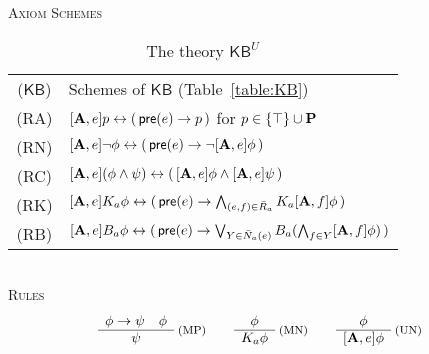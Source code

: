 \documentclass[12pt]{article}
\theoremstyle{definition}
\newcommand{\Prop}{{\bf P}}    %
\newcommand{\pre}{\mathsf{pre}}
\newcommand{\A}{{\bf A}}
\newcommand{\KB}{{\mathsf{KB}}}                        %
\begin{document}
\begin{table}[ht]
  \begin{center}
    \textsc{Axiom Schemes}\\[.4em]
    \renewcommand{\arraystretch}{1.3}
    \begin{tabular}[t]{cl}
      ($\KB$) & 
      Schemes of $\KB$ (Table~\ref{table:KB})
      \\
      (RA) &
      $[\A,e]p \leftrightarrow(\,\pre(e)\to p\,)$ for
      $p\in\{\top\}\cup\Prop$
      \\
      (RN) &
      $[\A,e]\lnot\phi \leftrightarrow(\,\pre(e)\to \lnot[\A,e]\phi\,)$
      \\
      (RC) &
      $[\A,e](\phi\land\psi) \leftrightarrow(\,[\A,e]\phi\land[\A,e]\psi\,)$
      \\
      (RK) &
      $\textstyle
      [\A,e]K_a\phi \leftrightarrow
      (\,\pre(e)\to \bigwedge_{(e,f)\in\bar{R}_a}K_a[\A,f]\phi\,)$
      \\
      (RB) &
      $\textstyle
      [\A,e]B_a\phi \leftrightarrow
      (\,\pre(e)\to \bigvee_{Y\in\bar{N}_a(e)}
      B_a(\bigwedge_{f\in
        Y}[\A,f]\phi)\,)$
    \end{tabular}
    \renewcommand{\arraystretch}{1.0}
    \\[1em]
    \textsc{Rules}\vspace{-.5em}
    \[
    \begin{array}{c}
      \phi\to\psi \quad \phi
      \\\hline
      \psi
    \end{array}\;\text{\footnotesize(MP)}
    \qquad
    \begin{array}{c}
      \phi
      \\\hline
      K_a\phi
    \end{array}\;\text{\footnotesize(MN)}
    \qquad
    \begin{array}{c}
      \phi
      \\\hline
      [\A,e]\phi
    \end{array}\;\text{\footnotesize(UN)}
    \]
  \end{center}
  \caption{The theory $\KB^U$}
  \label{table:KBU}
\end{table}
\end{document}
